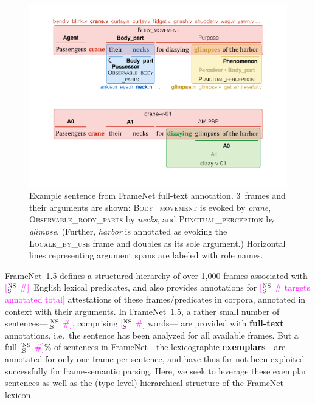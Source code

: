 \documentclass[11pt,a4paper]{article}
\newcommand{\ensuretext}[1]{#1}
\newcommand{\nssmarker}{\ensuretext{\textcolor{magenta}{\ensuremath{^{\textsc{NS}}_{\textsc{S}}}}}}
\newcommand{\arkcomment}[3]{\ensuretext{\textcolor{#3}{[#1 #2]}}}
\newcommand{\nss}[1]{\arkcomment{\nssmarker}{#1}{magenta}}
\newcommand{\fnf}[1]{\textsc{\textsf{#1}}} %
\begin{document}
\begin{figure}
\includegraphics[width=\columnwidth]{fig/harbor-fn.pdf}
\caption{Example sentence from FrameNet full-text annotation. 
3~frames and their arguments are shown: 
\fnf{Body\_movement} is evoked by \textit{crane},
\fnf{Observable\_body\_parts} by \textit{necks}, 
and \fnf{Punctual\_perception} by \textit{glimpse}.
(Further, \textit{harbor} is annotated as evoking the \fnf{Locale\_by\_use} frame 
and doubles as its sole argument.) 
Horizontal lines representing argument spans 
are labeled with role names.}
\label{fig:harbor-fn}
\end{figure}

FrameNet~1.5 defines a structured hierarchy of over 1,000 frames associated with \nss{\#}~English lexical predicates, 
and also provides annotations for \nss{\# targets annotated total} attestations 
of these frames/predicates in corpora, annotated in context with their arguments. 
In FrameNet~1.5, a rather small number of sentences---\nss{\#}, comprising \nss{\#} words---%
are provided with \textbf{full-text} annotations, i.e.~the sentence 
has been analyzed for all available frames. 
But a full \nss{\#}\% of sentences in FrameNet---the lexicographic \textbf{exemplars}---are annotated for only one frame per sentence, 
and have thus far not been exploited successfully for frame-semantic parsing.
Here, we seek to leverage these exemplar sentences 
as well as the (type-level) hierarchical structure of the FrameNet lexicon. 
\end{document}
